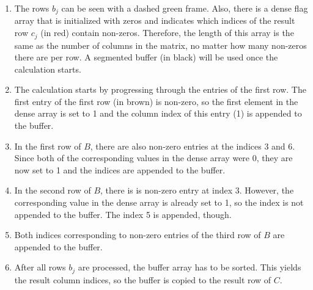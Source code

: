 \begin{enumerate}[label=\alph*)]
\item The rows $b_j$ can be seen  with a dashed green frame. Also, there is a dense flag array that is initialized with zeros and indicates which indices of the result row $c_j$ (in red) contain non-zeros. Therefore, the length of this array is the same as the number of columns in the matrix, no matter how many non-zeros there are per row. A segmented buffer (in black) will be used once the calculation starts. 
\item The calculation starts by progressing through the entries of the first row. The first entry of the first row (in brown) is non-zero, so the first element in the dense array is set to 1 and the  column index of this entry (1) is appended to the buffer.
\item In the first row of $B$, there are also non-zero entries at the indices 3 and 6. Since both of the corresponding values in the dense array were 0, they are now set to 1 and the indices are appended to the buffer.
\item In the second row of $B$, there is is non-zero entry at index 3. However, the corresponding value in the dense array is already set to 1, so the index is not appended to the buffer. The index 5 is appended, though.
\item Both indices corresponding to non-zero entries of the third row of $B$ are appended to the buffer.
\item After all rows $b_j$ are processed, the buffer array has to be sorted. This yields the result column indices, so the buffer is copied to the result row of $C$.
\end{enumerate}

